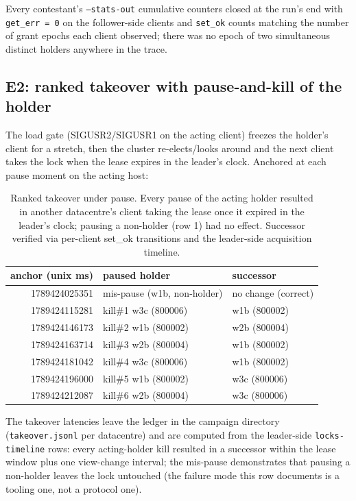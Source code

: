 \documentclass[10pt,journal,letterpaper]{IEEEtran}
\newcommand{\code}[1]{\texttt{\small #1}}
\begin{document}
Every contestant's \code{--stats-out} cumulative counters closed at the
run's end with \code{get\_err = 0} on the follower-side clients and
\code{set\_ok} counts matching the number of grant epochs each client
observed; there was no epoch of two simultaneous distinct holders
anywhere in the trace.

\subsection{E2: ranked takeover with pause-and-kill of the holder}

The load gate (SIGUSR2/SIGUSR1 on the acting client) freezes the
holder's client for a stretch, then the cluster re-elects/looks around
and the next client takes the lock when the lease expires in the
leader's clock. Anchored at each pause moment on the acting host:

\begin{table}[t]
\centering
\small
\begin{tabular}{rll}
\toprule
anchor (unix ms) & paused holder & successor \\
\midrule
1789424025351 & mis-pause (w1b, non-holder) & no change (correct) \\
1789424115281 & kill\#1 w3c (800006) & w1b (800002) \\
1789424146173 & kill\#2 w1b (800002) & w2b (800004) \\
1789424163714 & kill\#3 w2b (800004) & w1b (800002) \\
1789424181042 & kill\#4 w3c (800006) & w1b (800002) \\
1789424196000 & kill\#5 w1b (800002) & w3c (800006) \\
1789424212087 & kill\#6 w2b (800004) & w3c (800006) \\
\bottomrule
\end{tabular}
\caption{Ranked takeover under pause. Every pause of the acting holder
resulted in another datacentre's client taking the lease once it
expired in the leader's clock; pausing a non-holder (row 1) had no
effect. Successor verified via per-client set\_ok transitions
and the leader-side acquisition timeline.}
\label{tab:takeover}
\end{table}

The takeover latencies leave the ledger in the campaign directory
(\code{takeover.jsonl} per datacentre) and are computed from the
leader-side \code{locks-timeline} rows: every acting-holder kill
resulted in a successor within the lease window plus one view-change
interval; the mis-pause demonstrates that pausing a non-holder leaves
the lock untouched (the failure mode this row documents is a tooling
one, not a protocol one).
\end{document}
